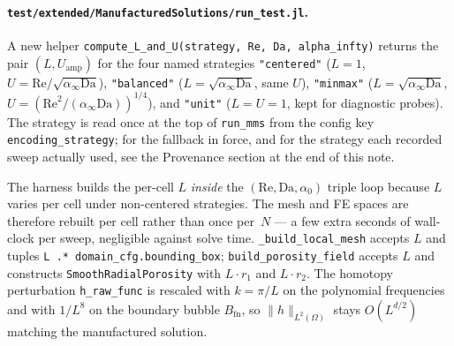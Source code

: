\documentclass[11pt]{article}
\newcommand{\code}[1]{\texttt{#1}}
\begin{document}
\paragraph{\texttt{test/extended/ManufacturedSolutions/run\_test.jl}.}
A new helper
\code{compute\_L\_and\_U(strategy, Re, Da, alpha\_infty)}
returns the pair $(L, U_{\mathrm{amp}})$ for the four named strategies
\code{"centered"} ($L = 1$, $U = \mathrm{Re}/\sqrt{\alpha_\infty \mathrm{Da}}$),
\code{"balanced"} ($L = \sqrt{\alpha_\infty \mathrm{Da}}$,
same $U$),
\code{"minmax"} ($L = \sqrt{\alpha_\infty \mathrm{Da}}$,
$U = (\mathrm{Re}^2 / (\alpha_\infty \mathrm{Da}))^{1/4}$), and
\code{"unit"} ($L = U = 1$, kept for diagnostic probes). The strategy
is read once at the top of \code{run\_mms} from the config key
\code{encoding\_strategy}; for the fallback in force, and for the strategy
each recorded sweep actually used, see the Provenance section at the end of
this note.

The harness builds the per-cell $L$ \emph{inside} the
$(\mathrm{Re}, \mathrm{Da}, \alpha_0)$ triple loop because $L$ varies
per cell under non-centered strategies. The mesh and FE spaces are
therefore rebuilt per cell rather than once per~$N$ — a few extra
seconds of wall-clock per sweep, negligible against solve time.
\code{\_build\_local\_mesh} accepts $L$ and tuples
\code{L .* domain\_cfg.bounding\_box}; \code{build\_porosity\_field}
accepts $L$ and constructs \code{SmoothRadialPorosity} with
$L \cdot r_1$ and $L \cdot r_2$. The homotopy perturbation
\code{h\_raw\_func} is rescaled with $k = \pi/L$ on the polynomial
frequencies and with $1/L^8$ on the boundary bubble $B_{\mathrm{fn}}$,
so $\|h\|_{L^2(\Omega)}$ stays $O(L^{d/2})$ matching the manufactured
solution.
\end{document}
